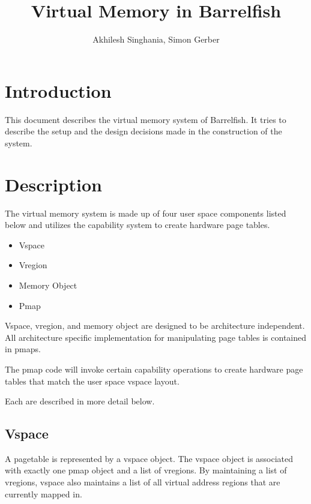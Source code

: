 \documentclass[a4paper,twoside]{report} %
\title{Virtual Memory in Barrelfish}   %
\author{Akhilesh Singhania, Simon Gerber}	%
\begin{document}
\maketitle

%
%
\begin{versionhistory}
\end{versionhistory}


\chapter{Introduction}

This document describes the virtual memory system of Barrelfish.
It tries to describe the setup and the design decisions made in the construction of the system.

\chapter{Description}

The virtual memory system is made up of four user space components listed
below and utilizes the capability system to create hardware page tables.

\begin{itemize}
\item Vspace
\item Vregion
\item Memory Object
\item Pmap
\end{itemize}

Vspace, vregion, and memory object are designed to be architecture independent.
All architecture specific implementation for manipulating page tables is contained in pmaps.

The pmap code will invoke certain capability operations to create hardware
page tables that match the user space vspace layout.

Each are described in more detail below.

\section{Vspace}
A pagetable is represented by a vspace object.
The vspace object is associated with exactly one pmap object and a list of vregions.
By maintaining a list of vregions,
vspace also maintains a list of all virtual address regions that are currently mapped in.
\end{document}
